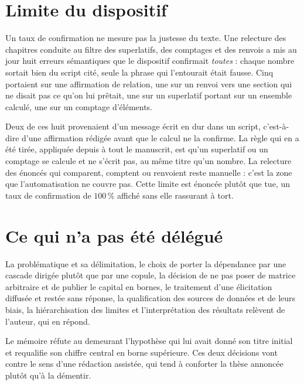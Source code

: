 \section{Limite du dispositif}

Un taux de confirmation ne mesure pas la justesse du texte. Une relecture des chapitres conduite au
filtre des superlatifs, des comptages et des renvois a mis au jour huit erreurs sémantiques que le
dispositif confirmait \emph{toutes} : chaque nombre sortait bien du script cité, seule la phrase qui
l'entourait était fausse. Cinq portaient sur une affirmation de relation, une sur un renvoi vers une
section qui ne disait pas ce qu'on lui prêtait, une sur un superlatif portant sur un ensemble
calculé, une sur un comptage d'éléments.

Deux de ces huit provenaient d'un message écrit en dur dans un script, c'est-à-dire d'une
affirmation rédigée avant que le calcul ne la confirme. La règle qui en a été tirée, appliquée
depuis à tout le manuscrit, est qu'un superlatif ou un comptage se calcule et ne s'écrit pas, au
même titre qu'un nombre. La relecture des énoncés qui comparent, comptent ou renvoient reste
manuelle : c'est la zone que l'automatisation ne couvre pas. Cette limite est énoncée plutôt que
tue, un taux de confirmation de $100\,\%$ affiché sans elle rassurant à tort.

\section{Ce qui n'a pas été délégué}

La problématique et sa délimitation, le choix de porter la dépendance par une cascade dirigée
plutôt que par une copule, la décision de ne pas poser de matrice arbitraire et de publier le
capital en bornes, le traitement d'une élicitation diffusée et restée sans réponse, la qualification des
sources de données et de leurs biais, la hiérarchisation des limites et l'interprétation des
résultats relèvent de l'auteur, qui en répond.

Le mémoire réfute au demeurant l'hypothèse qui lui avait donné son titre initial et requalifie son
chiffre central en borne supérieure. Ces deux décisions vont contre le sens d'une rédaction
assistée, qui tend à conforter la thèse annoncée plutôt qu'à la démentir.

